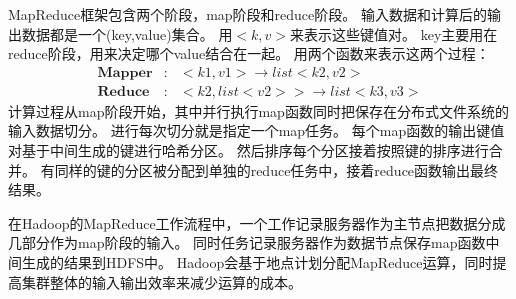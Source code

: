 MapReduce框架包含两个阶段，map阶段和reduce阶段。
输入数据和计算后的输出数据都是一个(key,value)集合。
用$<k,v>$来表示这些键值对。
key主要用在reduce阶段，用来决定哪个value结合在一起。
用两个函数来表示这两个过程：
\begin{eqnarray}
\mathbf{Mapper} &:& <k1,v1> \rightarrow list<k2,v2> \\
\mathbf{Reduce} &:& <k2,list<v2>> \rightarrow list<k3,v3>
\end{eqnarray}
计算过程从map阶段开始，其中并行执行map函数同时把保存在分布式文件系统的输入数据切分。
进行每次切分就是指定一个map任务。
每个map函数的输出键值对基于中间生成的键进行哈希分区。
然后排序每个分区接着按照键的排序进行合并。
有同样的键的分区被分配到单独的reduce任务中，接着reduce函数输出最终结果。

在Hadoop的MapReduce工作流程中，一个工作记录服务器作为主节点把数据分成几部分作为map阶段的输入。
同时任务记录服务器作为数据节点保存map函数中间生成的结果到HDFS中。
Hadoop会基于地点计划分配MapReduce运算，同时提高集群整体的输入输出效率来减少运算的成本。
